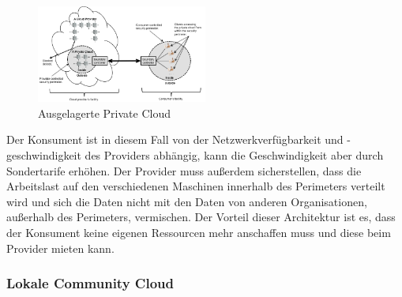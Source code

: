 \begin{figure}[H]
    \centering
	\includegraphics[width=0.5\textwidth]{Images/OutSourcedPrivateCloud}
	\caption{Ausgelagerte Private Cloud \cite{Badger}}
	\label{OutSourcedPrivateCloud}
\end{figure}

Der Konsument ist in diesem Fall von der Netzwerkverfügbarkeit und -geschwindigkeit des Providers abhängig, kann die Geschwindigkeit aber durch Sondertarife erhöhen.
Der Provider muss außerdem sicherstellen, dass die Arbeitslast auf den verschiedenen Maschinen innerhalb des Perimeters verteilt wird und sich die Daten 
nicht mit den Daten von anderen Organisationen, außerhalb des Perimeters, vermischen.
Der Vorteil dieser Architektur ist es, dass der Konsument keine eigenen Ressourcen mehr anschaffen muss und diese beim Provider mieten kann\cite{Badger}.

\subsubsection{Lokale Community Cloud}

